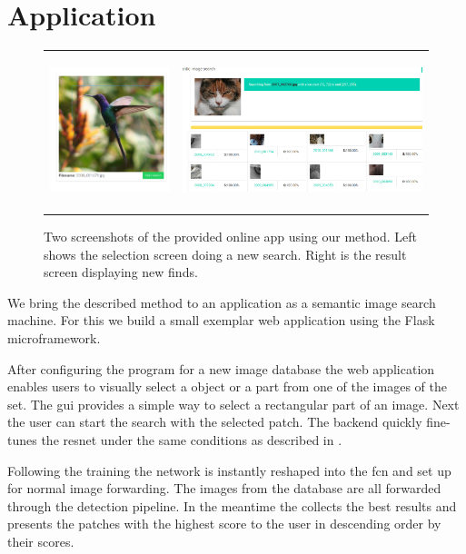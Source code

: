 %
\chapter{Application}
\label{sec:application}
\begin{figure}[h!]
    \begin{tabulary}{\textwidth}{cc}
        \includegraphics[height=4.5cm]{figures/server_select} &
        \includegraphics[height=4.5cm]{figures/server_results}
    \end{tabulary}
    \caption{Two screenshots of the provided online app using our method. Left shows the selection screen doing a new search. Right is the result screen displaying new finds.}
    \label{fig:application}
\end{figure}
We bring the described method to an application as a semantic image search machine. For this we build a small exemplar web application using the Flask microframework.

After configuring the program for a new image database the web application enables users to visually select a object or a part from one of the images of the set. The \gls{gui} provides a simple way to select a rectangular part of an image. Next the user can start the search with the selected patch. The backend quickly fine-tunes the \gls{resnet} under the same conditions as described in .

Following the training the network is instantly reshaped into the \gls{fcn} and set up for normal image forwarding. The images from the database are all forwarded through the detection pipeline. In the meantime the collects the best results and presents the patches with the highest score to the user in descending order by their scores.
